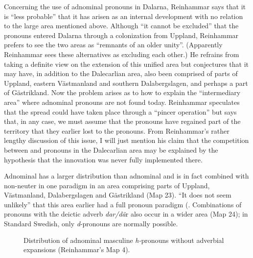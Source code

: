 Concerning the use of adnominal pronouns in Dalarna, Reinhammar says that it is “less probable” that it has arisen as an internal development with no relation to the large area mentioned above. Although “it cannot be excluded” that the pronouns entered Dalarna through a colonization from Uppland, Reinhammar prefers to see the two areas as “remnants of an older unity”. (Apparently Reinhammar sees these alternatives as excluding each other.) He refrains from taking a definite view on the extension of this unified area but conjectures that it may have, in addition to the Dalecarlian area, also been comprised of parts of Uppland, eastern Västmanland and southern Dalabergslagen, and perhaps a part of Gästrikland. Now the problem arises as to how to explain the “intermediary area” where adnominal pronouns are not found today. Reinhammar speculates that the spread could have taken place through a “pincer operation” but says that, in any case, we must assume that the pronouns have regained part of the territory that they earlier lost to the pronouns. From Reinhammar’s rather lengthy discussion of this issue, I will just mention his claim that the competition between  and pronouns in the Dalecarlian area may be explained by the hypothesis that the innovation was never fully implemented there. 




Adnominal has a larger distribution than adnominal and is in fact combined with non-neuter  in one paradigm in an area comprising parts of Uppland, Västmanland, Dalabergslagen and Gästrikland (Map 23). “It does not seem unlikely” that this area earlier had a full pronoun paradigm (\citet[43]{Reinhammar1975}. Combinations of pronouns with the deictic adverb \textit{dar/dä}r also occur in a wider area (Map 24); in Standard Swedish, only \textit{d}{}-pronouns are normally possible.   
 
 
 

\begin{figure} 
\caption{Distribution of adnominal masculine 
\textit{h-}pronouns without adverbial expansions (Reinhammar’s Map 4).}
\label{map:6:23}
\end{figure}

